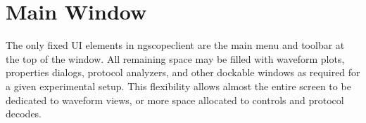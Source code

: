 \chapter{Main Window}

The only fixed UI elements in ngscopeclient are the main menu and toolbar at the top of the window. All remaining space
may be filled with waveform plots, properties dialogs, protocol analyzers, and other dockable windows as required for a
given experimental setup. This flexibility allows almost the entire screen to be dedicated to waveform views, or more
space allocated to controls and protocol decodes.
